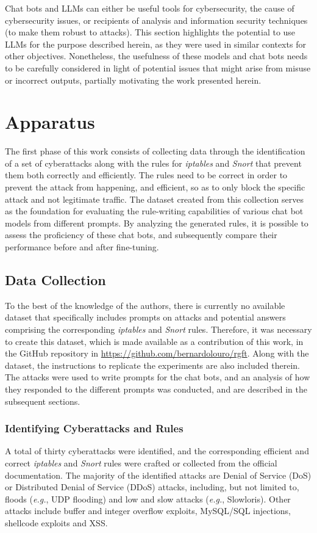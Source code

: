 \documentclass[sigconf]{acmart}
\begin{document}
Chat bots and LLMs can either be useful tools for cybersecurity, the cause of cybersecurity issues, or recipients of analysis and information security techniques (to make them robust to attacks). This section highlights the potential to use LLMs for the purpose described herein, as they were used in similar contexts for other objectives. Nonetheless, the usefulness of these models and chat bots needs to be carefully considered in light of potential issues that might arise from misuse or incorrect outputs, partially motivating the work presented herein.

\section{Apparatus}\label{sec:apparatus}
The first phase of this work consists of collecting data through the identification of a set of cyberattacks along with the rules for \textit{iptables} and \textit{Snort} that prevent them both correctly and efficiently. The rules need to be correct in order to prevent the attack from happening, and efficient, so as to only block the specific attack and not legitimate traffic. The dataset created from this collection serves as the foundation for evaluating the rule-writing capabilities of various chat bot models from different prompts. By analyzing the generated rules, it is possible to assess the proficiency of these chat bots, and subsequently compare their performance before and after fine-tuning.

\subsection{Data Collection}
To the best of the knowledge of the authors, there is currently no available dataset that specifically includes prompts on attacks and potential answers comprising the corresponding \textit{iptables} and \textit{Snort} rules. Therefore, it was necessary to create this dataset, which is made available as a contribution of this work, in the GitHub repository in \url{https://github.com/bernardolouro/rgft}. Along with the dataset, the instructions to replicate the experiments are also included therein. The attacks were used to write prompts for the chat bots, and an analysis of how they responded to the different prompts was conducted, and are described in the subsequent sections.

\subsubsection{Identifying Cyberattacks and Rules}
A total of thirty cyberattacks were identified, and the corresponding efficient and correct \textit{iptables} and \textit{Snort} rules were crafted or collected from the official documentation. The majority of the identified attacks are Denial of Service (DoS) or Distributed Denial of Service (DDoS) attacks, including, but not limited to, floods (\textit{e.g.}, UDP flooding) and low and slow attacks (\textit{e.g.}, Slowloris). Other attacks include buffer and integer overflow exploits, MySQL/SQL injections, shellcode exploits and XSS.
\end{document}
